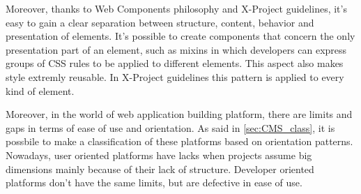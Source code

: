 Moreover, thanks to Web Components philosophy and X-Project guidelines, it's easy to gain a clear separation between structure, content, behavior and presentation of elements. 
It's possible to create components that concern the only presentation part of an element, such as mixins in which developers can express groups of CSS rules to be applied to different elements. This aspect also makes style extremly reusable.
In X-Project guidelines this pattern is applied to every kind of element.

Moreover, in the world of web application building platform, there are limits and gaps in terms of ease of use and orientation. As said in \ref{sec:CMS_class}, it is possbile to make a classification of these platforms based on orientation patterns. Nowadays, user oriented platforms have lacks when projects assume big dimensions mainly because of their lack of structure. Developer oriented platforms don't have the same limits, but are defective in ease of use. 

